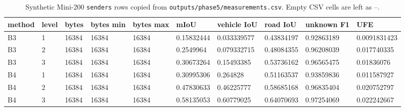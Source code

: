 \begin{table}[t]
\centering
\caption{Synthetic Mini-200 \texttt{senders} rows copied from \texttt{outputs/phase5/measurements.csv}. Empty CSV cells are left as --.}
\label{tab:senders}
\scriptsize
\setlength{\tabcolsep}{3pt}
\begin{tabular}{llllllllll}
\toprule
method & level & bytes & bytes min & bytes max & mIoU & vehicle IoU & road IoU & unknown F1 & UFE \\
\midrule
B3 & 1 & 16384 & 16384 & 16384 & 0.15832444 & 0.033339577 & 0.43834197 & 0.92863189 & 0.0091831423 \\
B3 & 2 & 16384 & 16384 & 16384 & 0.2549964 & 0.079332715 & 0.48084355 & 0.96208039 & 0.017740335 \\
B3 & 3 & 16384 & 16384 & 16384 & 0.30673264 & 0.15493385 & 0.53736162 & 0.96565475 & 0.01836076 \\
B4 & 1 & 16384 & 16384 & 16384 & 0.30995306 & 0.264828 & 0.51163537 & 0.93859836 & 0.011587927 \\
B4 & 2 & 16384 & 16384 & 16384 & 0.47830633 & 0.46225777 & 0.58685168 & 0.96835404 & 0.020752797 \\
B4 & 3 & 16384 & 16384 & 16384 & 0.58135053 & 0.60779025 & 0.64070693 & 0.97254069 & 0.022242667 \\
\bottomrule
\end{tabular}
\end{table}

